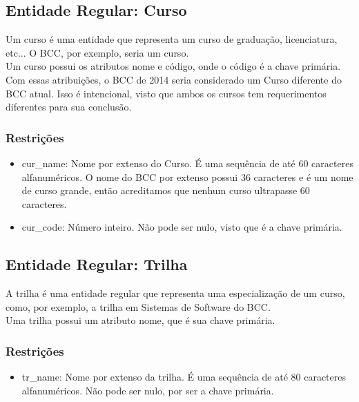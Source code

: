 \documentclass{article}
\begin{document}
  	\subsection{Entidade Regular: Curso}
  	    \quad Um curso é uma entidade que representa um curso de graduação, licenciatura, etc... O BCC, por exemplo, seria um curso. \\
  	    \null \quad Um curso possui os atributos nome e código, onde o código é a chave primária. Com essas atribuições, o BCC de 2014 seria considerado um Curso diferente do BCC atual. Isso é intencional, visto que ambos os cursos tem requerimentos diferentes para sua conclusão.
  	    \subsubsection{Restrições}
  	        \begin{itemize}
  	            \item cur\_name: Nome por extenso do Curso. É uma sequência de até 60 caracteres alfanuméricos. O nome do BCC por extenso possui 36 caracteres e é um nome de curso grande, então acreditamos que nenhum curso ultrapasse 60 caracteres.
  	            \item cur\_code: Número inteiro. Não pode ser nulo, visto que é a chave primária.
  		    \end{itemize}
  	
  	\subsection{Entidade Regular: Trilha}
  	    \quad A trilha é uma entidade regular que representa uma especialização de um curso, como, por exemplo, a trilha em Sistemas de Software do BCC. \\
  	    \null \quad Uma trilha possui um atributo nome, que é sua chave primária.
  	    \subsubsection{Restrições}
  	        \begin{itemize}
  	            \item tr\_name: Nome por extenso da trilha. É uma sequência de até 80 caracteres alfanuméricos. Não pode ser nulo, por ser a chave primária.
  		    \end{itemize}
  		    
\end{document}
